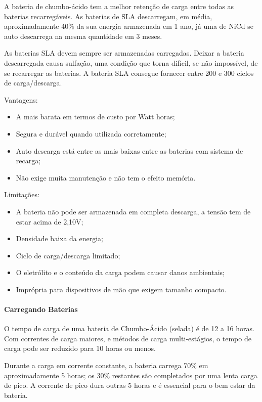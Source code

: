     A bateria de chumbo-ácido tem a melhor retenção de carga entre todas as baterias recarregáveis. As baterias de SLA descarregam, em média, aproximadamente 40\% da sua energia armazenada em 1 ano, já uma de NiCd se auto descarrega na mesma quantidade em 3 meses.

    As baterias SLA devem sempre ser armazenadas carregadas. Deixar a bateria descarregada causa sulfação, uma condição que torna difícil, se não impossível, de se recarregar as baterias. A bateria SLA consegue fornecer entre 200 e 300 ciclos de carga/descarga.

    Vantagens:
    \begin{itemize}
      \item A mais barata em termos de custo por Watt horas;
      \item Segura e durável quando utilizada corretamente;
      \item Auto descarga está entre as mais baixas entre as baterias com sistema de recarga;
      \item Não exige muita manutenção e não tem o efeito memória.
    \end{itemize}

    Limitações:
    \begin{itemize}
      \item A bateria não pode ser armazenada em completa descarga, a tensão tem de estar acima de 2,10V;
      \item Densidade baixa da energia;
      \item Ciclo de carga/descarga limitado;
      \item O eletrólito e o conteúdo da carga podem causar danos ambientais;
      \item Imprópria para dispositivos de mão que exigem tamanho compacto.
    \end{itemize}

\paragraph{Carregando Baterias}
  O tempo de carga de uma bateria de Chumbo-Ácido (selada) é de 12 a 16 horas. Com correntes de carga maiores, e métodos de carga multi-estágios, o tempo de carga pode ser reduzido para 10 horas ou menos.

  Durante a carga em corrente constante, a bateria carrega 70\% em aproximadamente 5 horas; os 30\% restantes são completados por uma lenta carga de pico. A corrente de pico dura outras 5 horas e é essencial para o bem estar da bateria.

